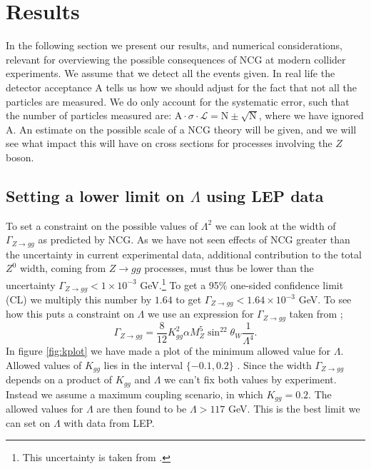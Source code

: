 \section{Results}
In the following section we present our results, and numerical considerations, relevant for overviewing the possible consequences of NCG at modern collider experiments. We assume that we detect all the events given. In real life the detector acceptance A tells us how we should adjust for the fact that not all the particles are measured. We do only account for the systematic error, such that the number of particles measured are: $\textrm{A} \cdot \sigma\cdot \mathcal{L}=\textrm{N} \pm \sqrt{\textrm{N} }$, where we have ignored A. An estimate on the possible scale of a NCG theory will be given, and we will see what impact this will have on cross sections for processes involving the $Z$ boson.

\subsection{Setting a lower limit on $\Lambda$ using LEP data}
To set a constraint on the possible values of $\Lambda^2$ we can look at the width of $\Gamma_{Z \rightarrow gg}$ as predicted by NCG. As we have not seen effects of NCG greater than the uncertainty in current experimental data, additional contribution to the total $Z^0$ width, coming from $Z \rightarrow gg$ processes, must thus be lower than the uncertainty $\Gamma_{Z \rightarrow gg} < 1 \times 10^{-3}$ GeV.\footnote{This uncertainty is taken from \cite{behr2003dnc}.} To get a 95\% one-sided confidence limit (CL) we multiply this number by $1.64$ \cite{amsler2008rpp} to get $\Gamma_{Z \rightarrow gg} < 1.64 \times 10^{-3}$ GeV. To see how this puts a constraint on $\Lambda$ we use an expression for $\Gamma_{Z \rightarrow gg}$ taken from \cite{behr2003dnc};
\begin{equation} \label{eq:zggwidth}
	\Gamma_{Z \rightarrow gg} = \frac{8}{12} K_{gg}^2 \alpha M_Z^5 \sin^22\theta_W \frac{1}{\Lambda^4}.
\end{equation}
In figure \ref{fig:kplot} we have made a plot of the minimum allowed value for $\Lambda$. Allowed values of $K_{gg}$ lies in the interval $\{-0.1,0.2\}$ \cite{behr2003dnc}. Since the width $\Gamma_{Z \rightarrow gg}$ depends on a product of $K_{gg}$ and $\Lambda$ we can't fix both values by experiment. Instead we assume a maximum coupling scenario, in which $K_{gg}=0.2$. The allowed values for $\Lambda$ are then found to be $\Lambda >117$ GeV. This is the best limit we can set on $\Lambda$ with data from LEP.

